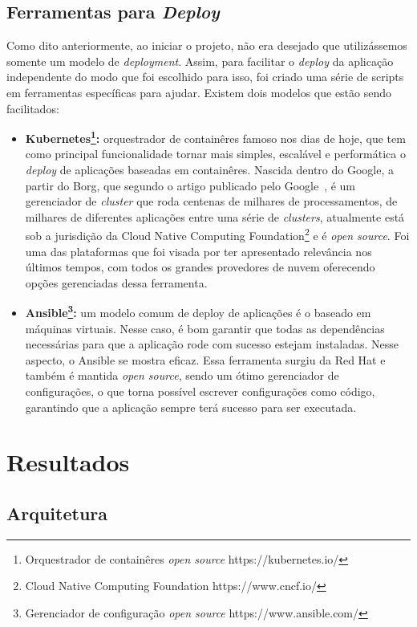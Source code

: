 \documentclass[11pt,twoside]{article}
\begin{document}
\subsection{Ferramentas para \emph{Deploy}}

Como dito anteriormente, ao iniciar o projeto, não era desejado que utilizássemos somente um modelo de \emph{deployment}. Assim, para facilitar o \emph{deploy} da aplicação independente
do modo que foi escolhido para isso, foi criado uma série de scripts em ferramentas específicas para ajudar. Existem dois modelos que estão sendo facilitados:

\begin{itemize}
  \item \textbf{Kubernetes\footnote{Orquestrador de containêres \emph{open source} https://kubernetes.io/}:} orquestrador de containêres famoso nos dias de hoje, que tem como principal funcionalidade tornar mais simples, escalável e performática o \emph{deploy}
  de aplicações baseadas em containêres. Nascida dentro do Google, a partir do Borg, que segundo o artigo publicado pelo Google~\cite{BORG}, é um gerenciador de \emph{cluster} que roda centenas de milhares de processamentos,
  de milhares de diferentes aplicações entre uma série de \emph{clusters},
  atualmente está sob a jurisdição da Cloud Native Computing Foundation\footnote{Cloud Native Computing Foundation https://www.cncf.io/} e é \emph{open source}. Foi uma
  das plataformas que foi visada por ter apresentado relevância nos últimos tempos, com todos os grandes provedores de nuvem oferecendo opções gerenciadas dessa 
  ferramenta.
  \item \textbf{Ansible\footnote{Gerenciador de configuração \emph{open source} https://www.ansible.com/}:} um modelo comum de deploy de aplicações é o baseado em máquinas virtuais. Nesse caso, é bom garantir que todas as dependências necessárias para que a 
  aplicação rode com sucesso estejam instaladas. Nesse aspecto, o Ansible se mostra eficaz. Essa ferramenta surgiu da Red Hat e também é mantida \emph{open source}, sendo um
  ótimo gerenciador de configurações, o que torna possível escrever configurações como código, garantindo que a aplicação sempre terá sucesso para ser executada.
\end{itemize}

\section{Resultados}

\subsection{Arquitetura}
\end{document}
